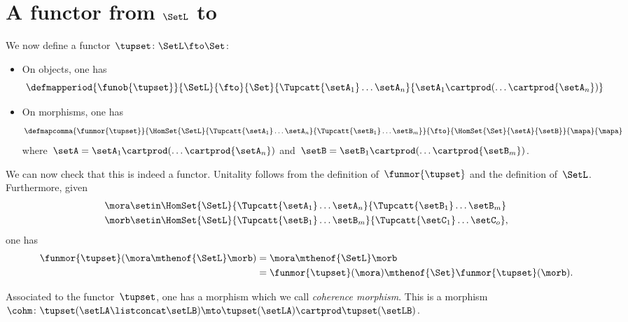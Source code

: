 \section{A functor from $\SetL$ to \Set}
\label{sec:funsetstarset}
We now define a functor~$\tupset\colon \SetL \fto \Set$:
\begin{itemize}
    \item On objects, one has
          \begin{equation*}
              \defmapperiod{\funob{\tupset}}{\SetL}{\fto}{\Set}{\Tupcatt {\setA_1}  \dots {\setA_n}}{{\setA_1}\cartprod (\ldots \cartprod {\setA_n})}
          \end{equation*}
    \item On morphisms, one has
          \begin{equation*}
              \defmapcomma{\funmor{\tupset}}{\HomSet{\SetL}{\Tupcatt{\setA_1}\dots{\setA_n}}{\Tupcatt{\setB_1} \dots {\setB_m}}}
              {\fto}{\HomSet{\Set}{\setA}{\setB}}{\mapa}{\mapa}
          \end{equation*}
          where~$\setA={\setA_1} \cartprod (\ldots \cartprod {\setA_n})$ and~$\setB={\setB_1} \cartprod (\ldots \cartprod {\setB_m})$.
\end{itemize}
We can now check that this is indeed a functor.
Unitality follows from the definition of~$\funmor{\tupset}$ and the definition of~$\SetL$.
Furthermore, given
\begin{equation*}
    \begin{aligned}
         & \mora \setin \HomSet{\SetL}{\Tupcatt{\setA_1}\dots{\setA_n}}{\Tupcatt{\setB_1} \dots {\setB_m}} \\
         & \morb \setin \HomSet{\SetL}{\Tupcatt{\setB_1}\dots{\setB_m}}{\Tupcatt{\setC_1}\dots {\setC_o}},
    \end{aligned}
\end{equation*}
one has
\begin{equation*}
    \begin{aligned}
        \funmor{\tupset}(\mora \mthenof{\SetL} \morb) & =\mora\mthenof{\SetL} \morb \\
                                                      & =\funmor{\tupset}(\mora)\mthenof{\Set} \funmor{\tupset}(\morb).
    \end{aligned}
\end{equation*}

\showslides{
    \begin{forslides}

        \begin{equation}
            \tupca \ela   = \ela
        \end{equation}
        ~
        \begin{equation}
            \label{eq:sets-monoid-el-cat}
            \tupcat \ela \elb \elconcat \elc = \tupcatt \ela \elb \elc
        \end{equation}
    \end{forslides}
}

Associated to the functor~$\tupset$, one has a morphism which we call \emph{coherence morphism}.
This is a morphism~$\cohm\colon \tupset(\setLA\listconcat \setLB)\mto \tupset(\setLA)\cartprod \tupset(\setLB)$.

